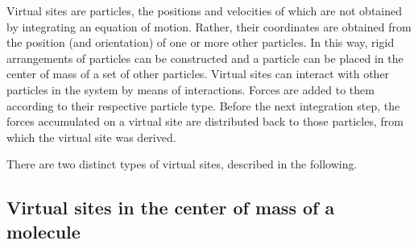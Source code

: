 Virtual sites are particles, the positions and velocities of which are
not obtained by integrating an equation of motion.  Rather, their
coordinates are obtained from the position (and orientation) of one or
more other particles. In this way, rigid arrangements of particles can
be constructed and a particle can be placed in the center of mass of a
set of other particles.  Virtual sites can interact with other
particles in the system by means of interactions. Forces are added to
them according to their respective particle type. Before the next
integration step, the forces accumulated on a virtual site are
distributed back to those particles, from which the virtual site was
derived.

There are two distinct types of virtual sites, described in the
following.

\subsection{Virtual sites in the center of mass of a molecule}

